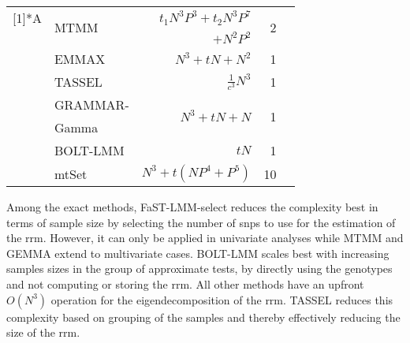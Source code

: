 \begin{table}[h]
\begin{small}
\begin{tabular}{llrrr}
    \addlinespace[3ex]
    \multirow{9}[1]{*}{A} & \multicolumn{1}{l}{\multirow{2}[0]{*}{MTMM}}  & \(t_1N^3P^3 + t_2N^3P^7 \) &  \multirow{2}[0]{*}{\num{2}} &  \multirow{2}[0]{*}{\citep{Korte2012}}\footnotemark[2] \\
                    \addlinespace[-.2ex]
          &  & \(+ N^2P^2\) & & \\
    		& EMMAX & \(N^3 + tN + N^2\) & \num{1} & \citep{Kang2010} \\
          & TASSEL & \(\frac{1}{c^3}N^3\) & \num{1} & \citep{Zhang2010} \\
          & GRAMMAR- & \multirow{2}[0]{*}{\(N^3 + tN + N\)} & \multirow{2}[0]{*}{\num{1}} & \multicolumn{1}{r}{\multirow{2}[0]{*}{\citep{Svishcheva2012}}} \\
          \addlinespace[-.5ex]
          & Gamma &       &       &  \\
          & BOLT-LMM & \(tN\) & \num{1} & \citep{Loh2014} \\
          & mtSet & \(N^3 + t(NP^4 + P^5)\) & \num{10} & \citep{Casale2015} \\
    \bottomrule
    \end{tabular}
  \end{small}
  \label{tab:lmmframeworks}%
  \vspace{-0.2cm}
\end{table}%
%
Among the exact methods, FaST-LMM-select reduces the complexity best in terms of sample size by selecting the number of \glspl{snp} to use for the estimation of the \gls{rrm}.  However, it can only be applied in univariate analyses while MTMM and GEMMA extend to multivariate cases.  BOLT-LMM scales best with increasing samples sizes in the group of approximate tests, by directly using the genotypes and not computing or storing the \gls{rrm}. All other methods have an upfront \(O(N^3)\) operation for the eigendecomposition of the \gls{rrm}. TASSEL reduces this complexity based on grouping of the samples and thereby effectively reducing the size of the \gls{rrm}.

